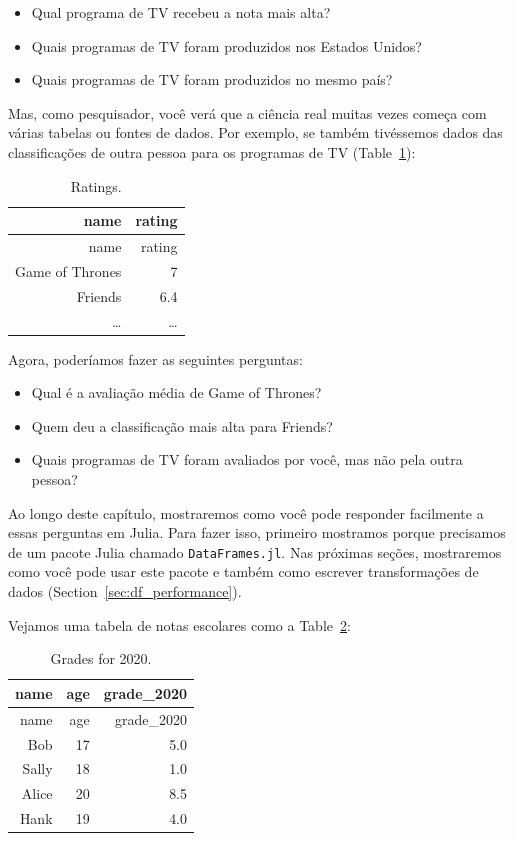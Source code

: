 \documentclass[
  notoc %
]{tufte-book}
\providecommand{\tightlist}{%
  \setlength{\itemsep}{0pt}\setlength{\parskip}{0pt}
}
\newcommand{\passthrough}[1]{#1}
\begin{document}
\begin{itemize}
\tightlist
\item
  Qual programa de TV recebeu a nota mais alta?
\item
  Quais programas de TV foram produzidos nos Estados Unidos?
\item
  Quais programas de TV foram produzidos no mesmo país?
\end{itemize}

Mas, como pesquisador, você verá que a ciência real muitas vezes começa
com várias tabelas ou fontes de dados. Por exemplo, se também tivéssemos
dados das classificações de outra pessoa para os programas de TV
(Table~\ref{tbl:ratings}):

\hypertarget{tbl:ratings}{}
\begin{longtable}[]{@{}rr@{}}
\caption{\label{tbl:ratings}Ratings.}\tabularnewline
\toprule
name & rating \\
\midrule
\endfirsthead
\toprule
name & rating \\
\midrule
\endhead
Game of Thrones & 7 \\
Friends & 6.4 \\
\ldots{} & \ldots{} \\
\bottomrule
\end{longtable}

Agora, poderíamos fazer as seguintes perguntas:

\begin{itemize}
\tightlist
\item
  Qual é a avaliação média de Game of Thrones?
\item
  Quem deu a classificação mais alta para Friends?
\item
  Quais programas de TV foram avaliados por você, mas não pela outra
  pessoa?
\end{itemize}

Ao longo deste capítulo, mostraremos como você pode responder facilmente
a essas perguntas em Julia. Para fazer isso, primeiro mostramos porque
precisamos de um pacote Julia chamado
\passthrough{\lstinline!DataFrames.jl!}. Nas próximas seções,
mostraremos como você pode usar este pacote e também como escrever
transformações de dados (Section~\ref{sec:df_performance}).

Vejamos uma tabela de notas escolares como a
Table~\ref{tbl:grades_for_2020}:

\hypertarget{tbl:grades_for_2020}{}
\begin{longtable}[]{@{}rrr@{}}
\caption{\label{tbl:grades_for_2020}Grades for 2020.}\tabularnewline
\toprule
name & age & grade\_2020 \\
\midrule
\endfirsthead
\toprule
name & age & grade\_2020 \\
\midrule
\endhead
Bob & 17 & 5.0 \\
Sally & 18 & 1.0 \\
Alice & 20 & 8.5 \\
Hank & 19 & 4.0 \\
\bottomrule
\end{longtable}
\end{document}

